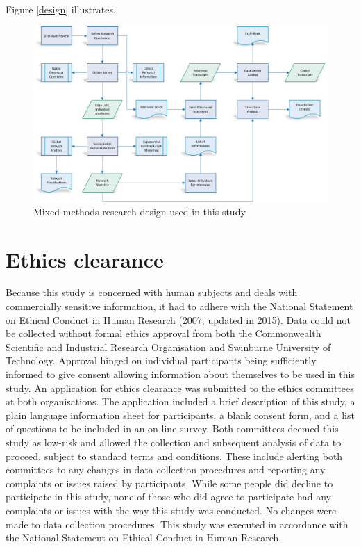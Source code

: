Figure \ref{design} illustrates.

\begin{landscape}
	\begin{figure}
		\centering
		\label{design}
		\includegraphics[width=1.0\linewidth]{Images/ResearchPlan_20160909}
		\caption{Mixed methods research design used in this study}
		\label{fig:researchplan20160402}
	\end{figure}
\end{landscape}


\section{Ethics clearance}

Because this study is concerned with human subjects and deals with commercially sensitive information, it had to adhere with the National Statement on Ethical Conduct in Human Research (2007, updated in 2015). Data could not be collected without formal ethics approval from both the Commonwealth Scientific and Industrial Research Organisation and Swinburne University of Technology. Approval hinged on individual participants being sufficiently informed to give consent allowing information about themselves to be used in this study. An application for ethics clearance was submitted to the ethics committees at both organisations. The application included a brief description of this study, a plain language information sheet for participants, a blank consent form, and a list of questions to be included in an on-line survey. Both committees deemed this study as low-risk and allowed the collection and subsequent analysis of data to proceed, subject to standard terms and conditions. These include alerting both committees to any changes in data collection procedures and reporting any complaints or issues raised by participants. While some people did decline to participate in this study, none of those who did agree to participate had any complaints or issues with the way this study was conducted. No changes were made to data collection procedures. This study was executed in accordance with the National Statement on Ethical Conduct in Human Research.\medskip

